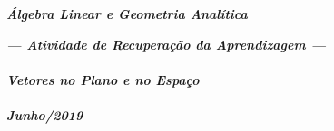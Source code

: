 \documentclass[pdftex, brazil, 12pt, oneside, addpoints]{exam}
\begin{document}
\begin{coverpages}

\begin{center}
\textbf{\textit{\Large%
Álgebra Linear e Geometria Analítica}}
\end{center}

\vspace{1cm}

\begin{figure}[H]
\begin{center}
\end{center}
\end{figure}

\vspace{1cm}

\begin{center}
\textit{\textbf{\Large%
    --- Atividade de Recuperação da Aprendizagem ---\\%
\ \\%
    Vetores no Plano e no Espaço\\%
\ \\%
Junho/2019}}
\end{center}



\end{coverpages}
\end{document}
